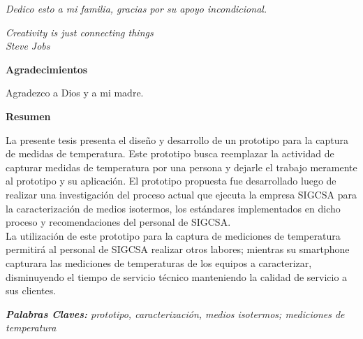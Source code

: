 \thispagestyle{headings}
\mbox{}
\clearpage

\thispagestyle{plain}

\begin{flushright}
	\vspace*{\fill}
	
	\textit{Dedico esto a mi familia, gracias por su apoyo incondicional.}
	
	
	\vspace*{\fill}
\end{flushright}

\clearpage

\thispagestyle{headings}
\mbox{}
\clearpage

\thispagestyle{plain}

\thispagestyle{plain}

\begin{flushright}
	\vspace*{\fill}
	
	\textit{Creativity is just connecting things}\\
	\textit{Steve Jobs}
	
	
	\vspace*{\fill}
\end{flushright}

\clearpage

\thispagestyle{plain}
\mbox{}
\clearpage

\thispagestyle{plain}
\begin{center}
	\huge
	\textbf{Agradecimientos}
\end{center}

\par \noindent
Agradezco a Dios y a mi madre.

\clearpage


\thispagestyle{plain}
\mbox{}
\clearpage

\thispagestyle{plain}
\begin{center}
	\huge
	\textbf{Resumen}
\end{center}

\par \noindent
La presente tesis presenta el diseño y desarrollo de un prototipo para la captura de medidas de temperatura. Este prototipo busca reemplazar la actividad de capturar medidas de temperatura por una persona y dejarle el trabajo meramente al prototipo y su aplicación. El prototipo propuesta fue desarrollado luego de realizar una investigación del proceso actual que ejecuta la empresa SIGCSA para la caracterización de medios isotermos, los estándares implementados en dicho proceso y recomendaciones del personal de SIGCSA.\\ 
La utilización de este prototipo para la captura de mediciones de temperatura permitirá al personal de SIGCSA realizar otros labores; mientras su smartphone capturara las mediciones de temperaturas de los equipos a caracterizar, disminuyendo el tiempo de servicio técnico manteniendo la calidad de servicio a sus clientes.

\par \noindent
\textit{\textbf{Palabras Claves:} prototipo, caracterización, medios isotermos; mediciones de temperatura}


\clearpage

\thispagestyle{plain}
\mbox{}
\clearpage
